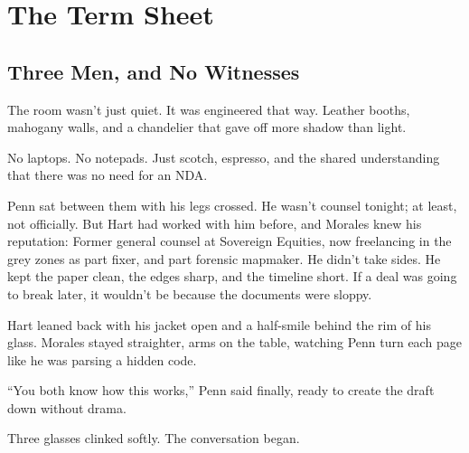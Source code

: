 
\section{The Term Sheet}

\subsection{Three Men, and No Witnesses}
The room wasn’t just quiet. It was engineered that way.
Leather booths, mahogany walls, and a chandelier that gave off more shadow than light.

No laptops. No notepads. Just scotch, espresso, and the shared understanding that there was 
no need for an NDA.

Penn sat between them with his legs crossed.
He wasn’t counsel tonight; at least, not officially.
But Hart had worked with him before, and Morales knew his reputation:
Former general counsel at Sovereign Equities, now freelancing in the grey zones as part fixer, and part 
forensic mapmaker.
He didn’t take sides. He kept the paper clean, the edges sharp, and the timeline short.
If a deal was going to break later, it wouldn’t be because the documents were sloppy.

Hart leaned back with his jacket open and a half-smile behind the rim of his glass.
Morales stayed straighter, arms on the table, watching Penn turn each page like he was parsing a hidden code.

``You both know how this works,'' Penn said finally, ready to create the draft down without drama. 

Three glasses clinked softly.
The conversation began.

\medskip


